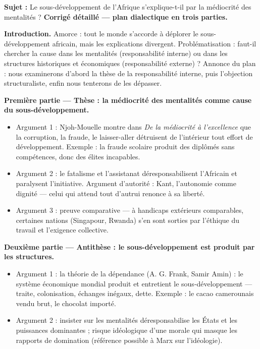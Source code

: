 \documentclass[11pt]{article}
\begin{document}
\begin{exoresolu}
\textbf{Sujet :} \guillemotleft Le sous-développement de l'Afrique s'explique-t-il par la médiocrité des mentalités ? \guillemotright
\tcblower
\textbf{Corrigé détaillé — plan dialectique en trois parties.}

\textbf{Introduction.} Amorce : tout le monde s'accorde à déplorer le sous-développement africain, mais les explications divergent. Problématisation : faut-il chercher la cause dans les mentalités (responsabilité interne) ou dans les structures historiques et économiques (responsabilité externe) ? Annonce du plan : nous examinerons d'abord la thèse de la responsabilité interne, puis l'objection structuraliste, enfin nous tenterons de les dépasser.

\textbf{Première partie — Thèse : la médiocrité des mentalités comme cause du sous-développement.}
\begin{itemize}
\item Argument 1 : Njoh-Mouelle montre dans \emph{De la médiocrité à l'excellence} que la corruption, la fraude, le laisser-aller détruisent de l'intérieur tout effort de développement. Exemple : la fraude scolaire produit des diplômés sans compétences, donc des élites incapables.
\item Argument 2 : le fatalisme et l'assistanat déresponsabilisent l'Africain et paralysent l'initiative. Argument d'autorité : Kant, l'autonomie comme dignité — celui qui attend tout d'autrui renonce à sa liberté.
\item Argument 3 : preuve comparative — à handicaps extérieurs comparables, certaines nations (Singapour, Rwanda) s'en sont sorties par l'éthique du travail et l'exigence collective.
\end{itemize}

\textbf{Deuxième partie — Antithèse : le sous-développement est produit par les structures.}
\begin{itemize}
\item Argument 1 : la théorie de la dépendance (A. G. Frank, Samir Amin) : le système économique mondial produit et entretient le sous-développement — traite, colonisation, échanges inégaux, dette. Exemple : le cacao camerounais vendu brut, le chocolat importé.
\item Argument 2 : insister sur les mentalités déresponsabilise les États et les puissances dominantes ; risque idéologique d'une morale qui masque les rapports de domination (référence possible à Marx sur l'idéologie).
\end{itemize}


\end{exoresolu}
\end{document}
